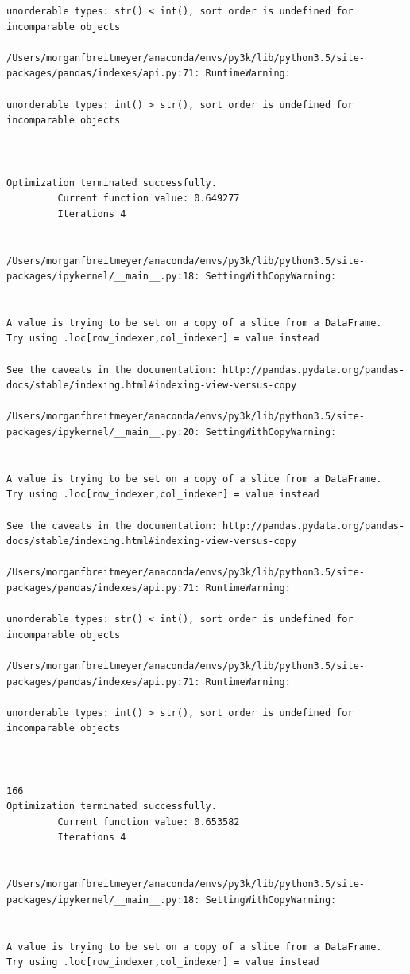 \begin{lstlisting}
unorderable types: str() < int(), sort order is undefined for incomparable objects

/Users/morganfbreitmeyer/anaconda/envs/py3k/lib/python3.5/site-packages/pandas/indexes/api.py:71: RuntimeWarning:

unorderable types: int() > str(), sort order is undefined for incomparable objects



Optimization terminated successfully.
         Current function value: 0.649277
         Iterations 4


/Users/morganfbreitmeyer/anaconda/envs/py3k/lib/python3.5/site-packages/ipykernel/__main__.py:18: SettingWithCopyWarning:


A value is trying to be set on a copy of a slice from a DataFrame.
Try using .loc[row_indexer,col_indexer] = value instead

See the caveats in the documentation: http://pandas.pydata.org/pandas-docs/stable/indexing.html#indexing-view-versus-copy

/Users/morganfbreitmeyer/anaconda/envs/py3k/lib/python3.5/site-packages/ipykernel/__main__.py:20: SettingWithCopyWarning:


A value is trying to be set on a copy of a slice from a DataFrame.
Try using .loc[row_indexer,col_indexer] = value instead

See the caveats in the documentation: http://pandas.pydata.org/pandas-docs/stable/indexing.html#indexing-view-versus-copy

/Users/morganfbreitmeyer/anaconda/envs/py3k/lib/python3.5/site-packages/pandas/indexes/api.py:71: RuntimeWarning:

unorderable types: str() < int(), sort order is undefined for incomparable objects

/Users/morganfbreitmeyer/anaconda/envs/py3k/lib/python3.5/site-packages/pandas/indexes/api.py:71: RuntimeWarning:

unorderable types: int() > str(), sort order is undefined for incomparable objects



166
Optimization terminated successfully.
         Current function value: 0.653582
         Iterations 4


/Users/morganfbreitmeyer/anaconda/envs/py3k/lib/python3.5/site-packages/ipykernel/__main__.py:18: SettingWithCopyWarning:


A value is trying to be set on a copy of a slice from a DataFrame.
Try using .loc[row_indexer,col_indexer] = value instead


\end{lstlisting}
